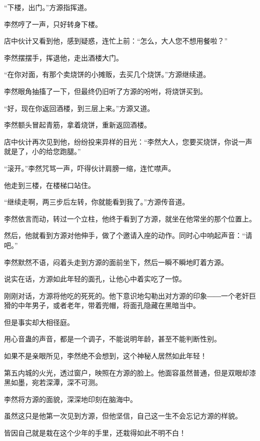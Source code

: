 \begin{this_body}
“下楼，出门。”方源指挥道。

李然哼了一声，只好转身下楼。

店中伙计又看到他，感到疑惑，连忙上前：“怎么，大人您不想用餐啦？”

李然摆摆手，挥退他，走出酒楼大门。

“在你对面，有那个卖烧饼的小摊贩，去买几个烧饼。”方源继续道。

李然眼角抽搐了一下，但最终仍旧听了方源的吩咐，将烧饼买到。

“好，现在你返回酒楼，到三层上来。”方源又道。

李然额头冒起青筋，拿着烧饼，重新返回酒楼。

店中伙计再次见到他，纷纷投来异样的目光：“李然大人，您要买烧饼，你说一声就是了，小的给您跑腿。”

“滚开。”李然咒骂一声，吓得伙计肩膀一缩，连忙噤声。

他走到三楼，在楼梯口站住。

“继续走啊，两三步后左转，你就能看到我了。”方源传音道。

李然依言而动，转过一个立柱，他终于看到了方源，就坐在他常坐的那个位置上。

然后，他就看到方源对他伸手，做了个邀请入座的动作。同时心中响起声音：“请吧。”

李然默然不语，闷着头走到方源的面前坐下，然后一瞬不瞬地盯着方源。

说实在话，方源如此年轻的面孔，让他心中着实吃了一惊。

刚刚对话，方源将他吃的死死的。他下意识地勾勒出对方源的印象――一个老奸巨猾的中年男子，或者老年，带着兜帽，将面孔隐藏在黑暗当中。

但是事实却大相径庭。

用心音蛊的声音，都是一个调子，不能说明年龄，甚至不能判断性别。

如果不是亲眼所见，李然绝不会想到，这个神秘人居然如此年轻！

第五内城的火光，透过窗户，映照在方源的脸上。他面容虽然普通，但是双眼却漆黑如墨，宛若深潭，深不可测。

李然将方源的面貌，深深地印刻在脑海中。

虽然这只是他第一次见到方源，但他坚信，自己这一生不会忘记方源的样貌。

皆因自己就是栽在这个少年的手里，还栽得如此不明不白！

\end{this_body}

